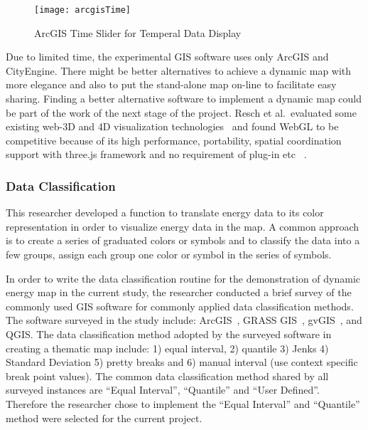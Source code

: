 \begin{figure}[h!]
  \centering
  \texttt{[image: arcgisTime]}
  \caption{ArcGIS Time Slider for Temperal Data Display}
  \label{fig:arcgisTime}
\end{figure}

Due to limited time, the experimental GIS software uses only ArcGIS
and CityEngine. There might be better alternatives to achieve a
dynamic map with more elegance and also to put the stand-alone map
on-line to facilitate easy sharing. Finding a better alternative
software to implement a dynamic map could be part of the work of the
next stage of the project. Resch et al.\ evaluated some existing
web-3D and 4D visualization technologies~\cite{Resch2014} and found
WebGL to be competitive because of its high performance, portability,
spatial coordination support with three.js framework and no
requirement of plug-in etc ~\cite{Resch2014}.

\subsubsection{Data Classification}\label{dataClassification}
This researcher developed a function to translate energy data to its
color representation in order to visualize energy data in the map. A
common approach is to create a series of graduated colors or symbols
and to classify the data into a few groups, assign each group one
color or symbol in the series of symbols.

In order to write the data classification routine for the
demonstration of dynamic energy map in the current study, the
researcher conducted a brief survey of the commonly used GIS software
for commonly applied data classification methods. The software
surveyed in the study include: ArcGIS~\cite{GIS_Jenks2014}, GRASS
GIS~\cite{GRASSGIS2008}, gvGIS~\cite{gvGIS2011}, and QGIS. The data
classification method adopted by the surveyed software in creating a
thematic map include: 1) equal interval, 2) quantile 3) Jenks 4)
Standard Deviation 5) pretty breaks and 6) manual interval (use
context specific break point values). The common data classification
method shared by all surveyed instances are ``Equal Interval'',
``Quantile'' and ``User Defined''. Therefore the researcher chose to
implement the ``Equal Interval'' and ``Quantile'' method were selected
for the current project.

